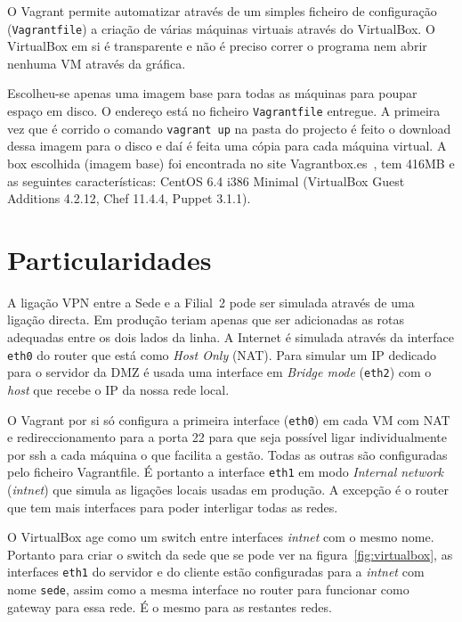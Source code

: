 \documentclass[12pt,a4paper]{report}
\begin{document}
O Vagrant\cite{Vagrant} permite automatizar através de um simples ficheiro de configuração (\texttt{Vagrantfile}) a criação de várias máquinas virtuais através do VirtualBox. O VirtualBox em si é transparente e não é preciso correr o programa nem abrir nenhuma VM através da gráfica.

Escolheu-se apenas uma imagem base para todas as máquinas para poupar espaço em disco. O endereço está no ficheiro \texttt{Vagrantfile} entregue. A primeira vez que é corrido o comando \texttt{vagrant up} na pasta do projecto é feito o download dessa imagem para o disco e daí é feita uma cópia para cada máquina virtual. A box escolhida (imagem base) foi encontrada no site Vagrantbox.es~\cite{Boxes}, tem 416MB e as seguintes características: CentOS 6.4 i386 Minimal (VirtualBox Guest Additions 4.2.12, Chef 11.4.4, Puppet 3.1.1).

\section{Particularidades}

A ligação VPN entre a Sede e a Filial~2 pode ser simulada através de uma ligação directa. Em produção teriam apenas que ser adicionadas as rotas adequadas entre os dois lados da linha. A Internet é simulada através da interface \texttt{eth0} do router que está como \emph{Host Only} (NAT). Para simular um IP dedicado para o servidor da DMZ é usada uma interface em \emph{Bridge mode} (\texttt{eth2}) com o \emph{host} que recebe o IP da nossa rede local.

O Vagrant por si só configura a primeira interface (\texttt{eth0}) em cada VM com NAT e redireccionamento para a porta 22 para que seja possível ligar individualmente por ssh a cada máquina o que facilita a gestão. Todas as outras são configuradas pelo ficheiro Vagrantfile. É portanto a interface \texttt{eth1} em modo \emph{Internal network} (\emph{intnet}) que simula as ligações locais usadas em produção. A excepção é o router que tem mais interfaces para poder interligar todas as redes.

O VirtualBox age como um switch entre interfaces \emph{intnet} com o mesmo nome. Portanto para criar o switch da sede que se pode ver na figura~\ref{fig:virtualbox}, as interfaces \texttt{eth1} do servidor e do cliente estão configuradas para a \emph{intnet} com nome \texttt{sede}, assim como a mesma interface no router para funcionar como gateway para essa rede. É o mesmo para as restantes redes.
\end{document}
